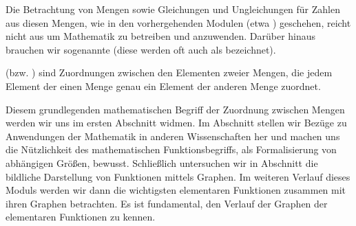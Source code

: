 \begin{MIntro}
\begin{MExercise}
\begin{MHint}{\iSolution}
\MTikzAuto{%
\begin{tikzpicture}
\draw[->,color=black] (5,0.0) -- (11,0.0);
\foreach \x in {6, 7, 8, 9, 10}
\draw[shift={(\x,0)},color=black] (0pt,2pt) -- (0pt,-2pt) node[below] {\footnotesize $\x$};
\draw (10.7,-0.3) node[] {$\mathbb{R}$};
\draw [line width=2.0pt,color=blue] (8,0.0)-- (8.5,0.0);
\draw [color = blue, fill = white] (8,0) circle (1.5pt);
\draw [fill = blue] (8.5,0) circle (1.5pt);
\end{tikzpicture}
}%

\end{MHint}
\end{MExercise}



Die Betrachtung von Mengen sowie Gleichungen und Ungleichungen für Zahlen aus diesen Mengen, wie in den vorhergehenden Modulen (etwa ) geschehen, reicht nicht aus um Mathematik zu betreiben und anzuwenden. Darüber hinaus brauchen wir sogenannte  (diese werden oft auch als  bezeichnet). 
\begin{MInfo}
 (bzw. ) sind Zuordnungen zwischen den Elementen zweier Mengen, die jedem Element der einen Menge genau ein Element der anderen Menge zuordnet.%
\end{MInfo}
\end{MIntro}

Diesem grundlegenden mathematischen Begriff der Zuordnung zwischen Mengen werden wir uns im ersten Abschnitt  widmen. Im Abschnitt  stellen wir Bezüge zu Anwendungen der Mathematik in anderen Wissenschaften her und machen uns die Nützlichkeit des mathematischen Funktionsbegriffs, als Formalisierung von abhängigen Größen, bewusst. Schließlich untersuchen wir in Abschnitt  die bildliche Darstellung von Funktionen mittels Graphen. Im weiteren Verlauf dieses Moduls werden wir dann die wichtigsten elementaren Funktionen zusammen mit ihren Graphen betrachten. Es ist fundamental, den Verlauf der Graphen der elementaren Funktionen zu kennen. 


